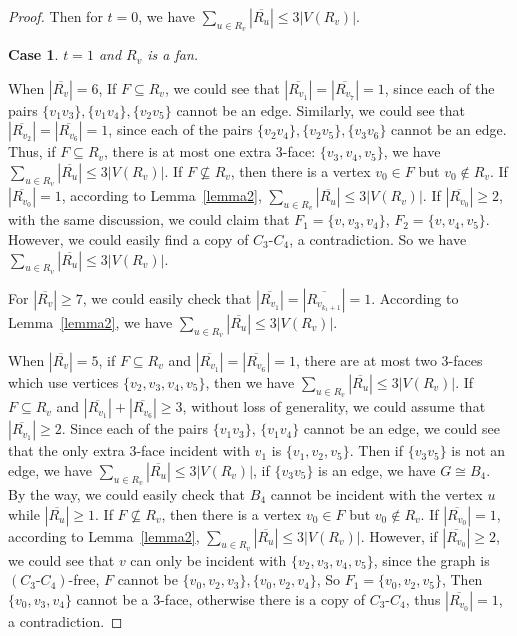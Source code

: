 \documentclass[12pt]{article}
\newtheorem{case}{Case}[section]
\begin{document}
\begin{proof}
    Then for $t=0$, we have $\sum_{u \in R_v}|\overline{R_u}| \leq 3|V(R_v)|$.
    
    \begin{case}
         $t=1$ and $R_v$ is a fan.
    \end{case}
    
    When $|\overline{R_v}| = 6$, If $F\subseteq R_v$, we could see that $|\overline{R_{v_1}}|=|\overline{R_{v_7}}|=1$, since each of the pairs $\{v_1v_3\},\{v_1v_4\},\{v_2v_5\}$ cannot be an edge. Similarly, we could see that $|\overline{R_{v_2}}|=|\overline{R_{v_6}}|=1$, since each of the pairs $\{v_2v_4\},\{v_2v_5\},\{v_3v_6\}$ cannot be an edge. Thus, if $F\subseteq R_v$, there is at most one extra $3$-face: $\{v_3,v_4,v_5\}$, we have $\sum_{u \in R_v}|\overline{R_u}| \leq 3|V(R_v)|$. If $F\not\subseteq R_v$, then there is a vertex $v_0\in F$ but $v_0 \not\in R_v$. If $|\overline{R_{v_0}}|=1$, according to Lemma~\ref{lemma2}, $\sum_{u \in R_v}|\overline{R_u}| \leq 3|V(R_v)|$. If $|\overline{R_{v_0}}|\geq2$, with the same discussion, we could claim that $F_1=\{v,v_3,v_4\}$, $F_2=\{v,v_4,v_5\}$. However, we could easily find a copy of $C_3\text{-}C_4$, a contradiction. So we have $\sum_{u \in R_v}|\overline{R_u}| \leq 3|V(R_v)|$.
    
    For $|\overline{R_v}|\geq7$, we could easily check that $|\overline{R_{v_1}}|=|\overline{R_{v_{k_1+1}}}|=1$. According to Lemma~\ref{lemma2}, we have $\sum_{u \in R_v}|\overline{R_u}| \leq 3|V(R_v)|$.
    
    When $|\overline{R_v}|=5$, if $F\subseteq R_v$ and $|\overline{R_{v_1}}|=|\overline{R_{v_6}}|=1$, there are at most two $3$-faces which use vertices $\{v_2,v_3,v_4,v_5\}$, then we have $\sum_{u \in R_v}|\overline{R_u}| \leq 3|V(R_v)|$. If $F\subseteq R_v$ and $|\overline{R_{v_1}}|+|\overline{R_{v_6}}| \geq 3$, without loss of generality, we could assume that $|\overline{R_{v_1}}| \geq 2$. Since each of the pairs $\{v_1v_3\}$, $\{v_1v_4\}$ cannot be an edge, we could see that the only extra $3$-face incident with $v_1$ is $\{v_1,v_2,v_5\}$. Then if $\{v_3v_5\}$ is not an edge, we have $\sum_{u \in R_v}|\overline{R_u}| \leq 3|V(R_v)|$, if $\{v_3 v_5\}$ is an edge, we have $G \cong B_4$. By the way, we could easily check that $B_4$ cannot be incident with the vertex $u$ while $|\overline{R_u}| \geq 1$. If $F\not\subseteq R_v$, then there is a vertex $v_0\in F$ but $v_0 \not\in R_v$. If $|\overline{R_{v_0}}|=1$, according to Lemma~\ref{lemma2}, $\sum_{u \in R_v}|\overline{R_u}| \leq 3|V(R_v)|$. However, if $|\overline{R_{v_0}}| \geq 2$, we could see that $v$ can only be incident with $\{v_2,v_3,v_4,v_5\}$, since the graph is $(C_3\text{-}C_4)$-free, $F$ cannot be $\{v_0,v_2,v_3\} , \{v_0,v_2,v_4\}$, So $F_1=\{v_0,v_2,v_5\}$, Then $\{v_0,v_3,v_4\}$ cannot be a $3$-face, otherwise there is a copy of $C_3\text{-}C_4$, thus $|\overline{R_{v_0}}|=1$, a contradiction.
    

\end{proof}
\end{document}
